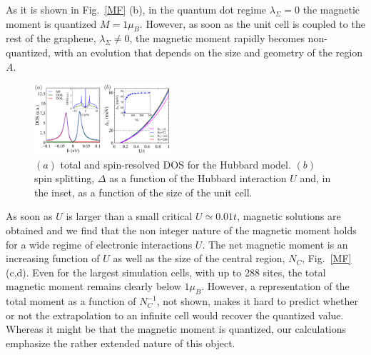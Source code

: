 \documentclass[aps,prb,twocolumn,superscriptaddress]{revtex4-1}
\begin{document}
As it is shown in Fig.~\ref{MF} (b), in the quantum dot regime $\lambda_\Sigma = 0$ the magnetic moment is quantized $M=1\mu_B$. However, as soon as the unit cell is coupled to the rest of the graphene, $\lambda_\Sigma \ne 0$, the magnetic moment rapidly becomes non-quantized, with an evolution that depends on the size and geometry of the region $A$.
\begin{figure}[h!]
\centering
\includegraphics[width=0.45\textwidth]{MFfig2_dos.pdf}
\vspace{-15pt}
\caption{$(a)$ total and spin-resolved DOS for the Hubbard model. $(b)$ spin splitting, $\Delta$ as a function of the Hubbard interaction $U$ and, in the inset, as a function of the size of the unit cell.}
\label{MFdos}
\end{figure}
As soon as $U$ is larger than a small critical $U\simeq 0.01 t$, magnetic solutions are obtained and we find that the non integer nature of the magnetic moment holds for a wide regime of electronic interactions $U$.
The net magnetic moment is an increasing function of $U$ as well as the size of the central region, $N_C$, Fig.~\ref{MF} (c,d). Even for the largest simulation cells, with up to 288 sites, the total magnetic moment remains clearly below $1\mu_B$. However, a representation of the total moment as a function of $N_C^{-1}$, not shown, makes it hard to predict whether or not the extrapolation to an infinite cell would recover the quantized value. Whereas it might be that the magnetic moment is quantized, our calculations emphasize the rather extended nature of this object.
\end{document}

